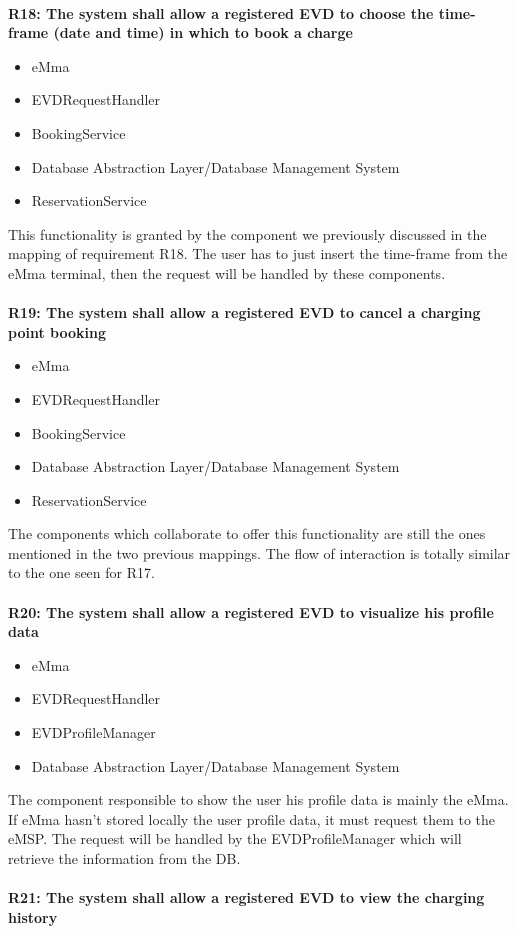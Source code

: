 \\
\textbf{R18: The system shall allow a registered EVD to choose the time-frame (date and time) in which to book a charge}
\begin{itemize}
	\item eMma
	\item EVDRequestHandler
	\item BookingService
	\item Database Abstraction Layer/Database Management System
	\item ReservationService
\end{itemize}
This functionality is granted by the component we previously discussed in the mapping of requirement R18. The user has to just insert the time-frame from the eMma terminal, then the request will be handled by these components.\\
\\
\textbf{R19: The system shall allow a registered EVD to cancel a charging point booking}
\begin{itemize}
	\item eMma
	\item EVDRequestHandler
	\item BookingService
	\item Database Abstraction Layer/Database Management System
	\item ReservationService
\end{itemize}
The components which collaborate to offer this functionality are still the ones mentioned in the two previous mappings. The flow of interaction is totally similar to the one seen for R17.\\
\\
\textbf{R20: The system shall allow a registered EVD to visualize his profile data}
\begin{itemize}
	\item eMma
	\item EVDRequestHandler
	\item EVDProfileManager
    \item Database Abstraction Layer/Database Management System
\end{itemize}
The component responsible to show the user his profile data is mainly the eMma. If eMma hasn't stored locally the user profile data, it must request them to the eMSP. The request will be handled by the EVDProfileManager which will retrieve the information from the DB.\\
\\
\textbf{R21: The system shall allow a registered EVD to view the charging history}
